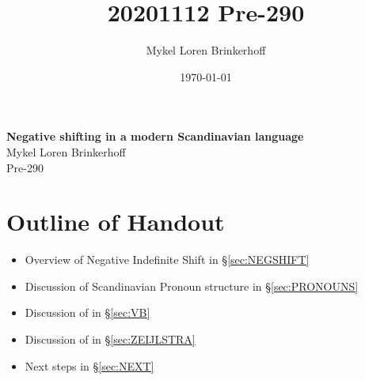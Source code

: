 \documentclass[12pt, letterpaper]{article}
\title{20201112 Pre-290}
\author{Mykel Loren Brinkerhoff}
\date{\today}
\begin{document}
	
	
	
\begin{center}
	{\Large \textbf{Negative shifting in a modern Scandinavian language}}\\
	\vspace{6pt}
	Mykel Loren Brinkerhoff\\
	Pre-290
\end{center}
\thispagestyle{fancy}

\section*{Outline of Handout} \label{sec:OUTLINE}
\begin{itemize}
	\item Overview of Negative Indefinite Shift in §\ref{sec:NEGSHIFT}
	\item Discussion of Scandinavian Pronoun structure in §\ref{sec:PRONOUNS}
	\item Discussion of \cite{valentinebordalNegationExistentialPredications2017} in §\ref{sec:VB}
	\item Discussion of \cite{zeijlstraSyntacticallyComplexStatus2011} in §\ref{sec:ZEIJLSTRA}
	\item Next steps in §\ref{sec:NEXT}
\end{itemize}

\end{document}
